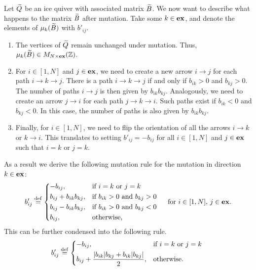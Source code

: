 Let $\widetilde{Q}$ be an ice quiver with associated matrix $\widetilde{B}$. We now want to describe what
happens to the matrix $\widetilde{B}$ after mutation. Take some $k \in \mathbf{ex}$, and denote the
elements of $\mu_k(\widetilde{B})$ with $b'_{ij}$.
\begin{enumerate}
	\item The vertices of $\widetilde{Q}$ remain unchanged under mutation. Thus, $\mu_k(\widetilde{B}) \in M_{N
				      \times \mathbf{ex}}(\mathbb{Z})$.
	\item For $i \in [1, N]$ and $j \in \mathbf{ex}$, we need to create a new arrow $i \to j$ for each
	      path $i \to k \to j$. There is a path $i \to k \to j$ if and only if $b_{ik} >0$ and
	      $b_{kj} > 0$. The number of paths $i\to j$ is then given by $b_{ik}b_{kj}$.
	      Analogously, we need to create an arrow $j \to i$ for each path $j \to k \to i$. Such
	      paths exist if $b_{ik} <0$ and $b_{kj} < 0$. In this case, the number of paths is also
	      given by $b_{ik}b_{kj}$.
	\item Finally, for $i \in [1,N]$, we need to flip the orientation of all the arrows $i \to k$
	      or $k \to i$. This translates to setting $b'_{ij} = -b_{ij}$ for all $i \in [1, N]$ and
	      $j \in \mathbf{ex}$ such that $i = k$ or $j = k$.
\end{enumerate}
As a result we derive the following mutation rule for the mutation in direction $k\in \mathbf{ex}$:
\begin{equation}\label{eq:mutation_rule_matrix_expanded}
	b'_{ij} \defeq \begin{dcases*}
		-b_{ij},               & if $i = k$ or $j = k$          \\
		b_{ij} + b_{ik}b_{kj}, & if $b_{ik}>0$ and $b_{kj} > 0$ \\
		b_{ij} - b_{ik}b_{kj}, & if $b_{ik}>0$ and $b_{kj} < 0$ \\
		b_{ij},                & otherwise,
	\end{dcases*}
	\quad \text{for } i \in [1, N],\,j \in \ex.
\end{equation}
%
This can be further condensed into the following rule.
\begin{equation}\label{eq:mutation_rule_matrix_condensed}
	b'_{ij} \defeq \begin{dcases*}
		-b_{ij},                                            & if $i = k$ or $j = k$ \\
		b_{ij} + \frac{|b_{ik}|b_{kj} + b_{ik}|b_{kj}|}{2}, & otherwise.
	\end{dcases*}
\end{equation}

